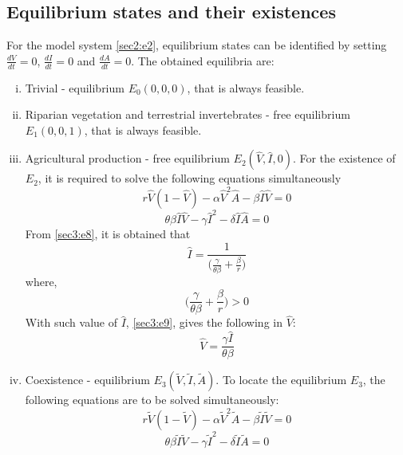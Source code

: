 \documentclass[12pt]{article}
\numberwithin{equation}{section}
\begin{document}
\subsection{Equilibrium states and their existences}
For the model system \eqref{sec2:e2}, equilibrium states can be identified by setting $\frac{dV}{dt}=0$, $\frac{dI}{dt}=0$ and $\frac{dA}{dt}=0$. The obtained equilibria are:
\begin{enumerate}[i)]
\item Trivial - equilibrium $E_0(0,0,0)$, that is always feasible.
\item Riparian vegetation and terrestrial invertebrates - free equilibrium $E_1(0,0,1)$, that is always feasible.
\item Agricultural production - free equilibrium $E_2(\hat V, \hat I, 0)$. For the existence of $E_2$, it is required to solve the following equations simultaneously
\begin{equation}\label{sec3:e8}
r \hat V(1- \hat V)-\alpha \hat V^2 \hat A - \beta \hat I \hat V=0
\end{equation}
\begin{equation}\label{sec3:e9}
\theta \beta \hat I \hat V - \gamma \hat I^2 - \delta \hat I \hat A=0
\end{equation}
From \eqref{sec3:e8}, it is obtained that
\begin{equation}\label{sec3:e10}
\hat I=\frac{1}{\bigg( \frac{\gamma}{\theta \beta} + \frac{\beta}{r}\bigg)}
\end{equation}
where,
\begin{equation}\label{sec3:e11}
\bigg( \frac{\gamma}{\theta \beta} + \frac{\beta}{r}\bigg) > 0
\end{equation}
With such value of $\hat I$, \eqref{sec3:e9}, gives the following in $\hat V$:
\begin{equation}\label{sec3:e12}
\hat V = \frac{\gamma \hat I}{\theta \beta}
\end{equation}
\item Coexistence - equilibrium $E_3 (\tilde V, \tilde I, \tilde A)$. To locate the equilibrium $E_3$, the following equations are to be solved simultaneously:
\begin{equation}\label{sec3:e13}
r\tilde V(1- \tilde V)-\alpha \tilde V^2 \tilde A - \beta \tilde I \tilde V=0
\end{equation}
\begin{equation}\label{sec3:e14}
\theta \beta \tilde I \tilde V - \gamma \tilde I^2 - \delta \tilde I \tilde A=0
\end{equation}

\end{enumerate}
\end{document}
